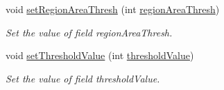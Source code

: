 \begin{DoxyCompactItemize}
void \hyperlink{classmultiscale_1_1analysis_1_1RegionDetector_a5cf10aea88e85198ce54df0e94e6d1a7}{set\-Region\-Area\-Thresh} (int \hyperlink{classmultiscale_1_1analysis_1_1RegionDetector_a1f637073a3d946d000dceed01412f19a}{region\-Area\-Thresh})
\begin{DoxyCompactList}\small\item\em \-Set the value of field region\-Area\-Thresh. \end{DoxyCompactList}\item 
void \hyperlink{classmultiscale_1_1analysis_1_1RegionDetector_a066e87a1f134194dabfc760d241b8ab2}{set\-Threshold\-Value} (int \hyperlink{classmultiscale_1_1analysis_1_1RegionDetector_a0f7469d124c0b906d199e00ea5713007}{threshold\-Value})
\begin{DoxyCompactList}\small\item\em \-Set the value of field threshold\-Value. \end{DoxyCompactList}\end{DoxyCompactItemize}
